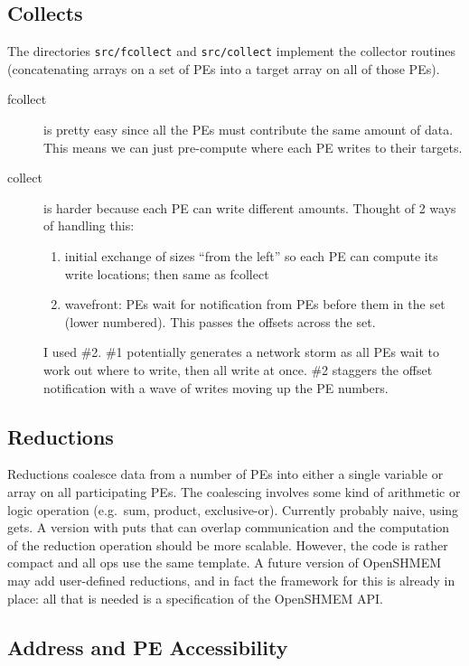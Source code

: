 \documentclass[english]{article}
\begin{document}
\subsection{Collects}

The directories \texttt{src/fcollect} and \texttt{src/collect}
implement the collector routines (concatenating arrays on a set of PEs
into a target array on all of those PEs).

\begin{description}
\item[fcollect] is pretty easy since all the PEs must contribute the
  same amount of data. This means we can just pre-compute where each PE
  writes to their targets.
\item[collect] is harder because each PE can write different
  amounts. Thought of 2 ways of handling this:
  \begin{enumerate}
  \item initial exchange of sizes ``from the left'' so each PE can
    compute its write locations; then same as fcollect
  \item wavefront: PEs wait for notification from PEs before them in the
    set (lower numbered). This passes the offsets across the set.
  \end{enumerate}
  I used \#2. \#1 potentially generates a network storm as all PEs wait
  to work out where to write, then all write at once. \#2 staggers the
  offset notification with a wave of writes moving up the PE numbers.
\end{description}

\subsection{Reductions}

Reductions coalesce data from a number of PEs into either a single
variable or array on all participating PEs. The coalescing involves
some kind of arithmetic or logic operation (e.g.\ sum, product,
exclusive-or).  Currently probably naive, using gets. A version with
puts that can overlap communication and the computation of the
reduction operation should be more scalable. However, the code is
rather compact and all ops use the same template. A future version of
OpenSHMEM may add user-defined reductions, and in fact the framework
for this is already in place: all that is needed is a specification of
the OpenSHMEM API.

\subsection{Address and PE Accessibility}
\end{document}
